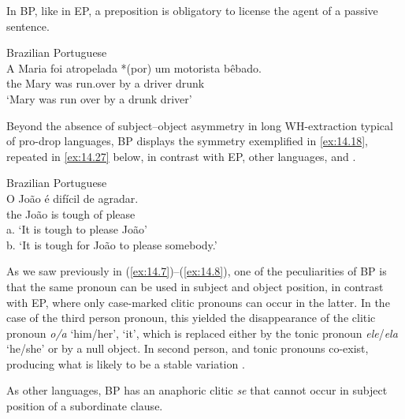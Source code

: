 \documentclass[output=paper]{langsci/langscibook}
\begin{document}

In \gls{BP}, like in \gls{EP},
a preposition is obligatory to license the agent of a passive sentence.

\ea\label{ex:14.26}Brazilian Portuguese\\
    \gll    A Maria foi atropelada *(por) um motorista bêbado.\\
            the Mary was run.over \hphantom{*(}by a driver drunk\\
    \glt    ‘Mary was run over by a drunk driver’\\
\z


Beyond the absence of subject--object asymmetry in long
WH-extraction typical
of pro-drop languages, \gls{BP} displays the symmetry exemplified in
\eqref{ex:14.18}, repeated in \eqref{ex:14.27} below, in contrast with \gls{EP},
other  languages, and .

\ea%
    \label{ex:14.27}Brazilian Portuguese\\
    \gll    O João é difícil de agradar.\\
            the João is tough of please\\
	\glt    a. ‘It is tough to please João’\\
            b. ‘It is tough for João to please somebody.’
\z


As we saw previously in (\ref{ex:14.7})--(\ref{ex:14.8}), one of the
peculiarities of \gls{BP} is that the same pronoun can
be used in subject and object position, in contrast with \gls{EP}, where only case-marked clitic pronouns can occur in the latter. In
the case of the third person pronoun, this yielded the disappearance of the
clitic pronoun \emph{o/a} `him/her', `it', which is replaced either by the tonic
pronoun \emph{ele}/\emph{ela} ‘he/she’ or by a null object. In
second person,  and tonic pronouns co-exist, producing what is
likely to be a stable variation \citep{Galves2019}.


As other  languages, \gls{BP} has an anaphoric clitic \emph{se} that
cannot occur in subject position of a subordinate clause.
\end{document}
